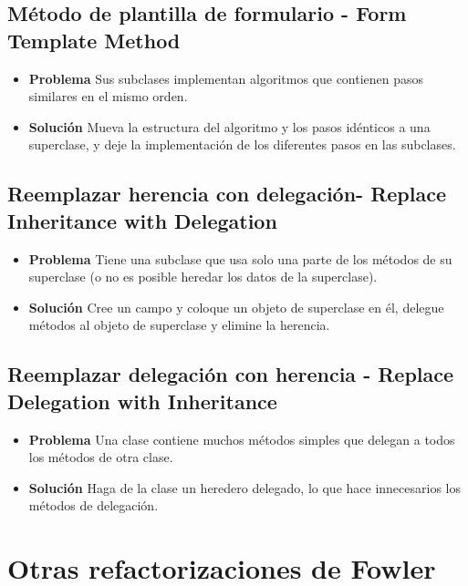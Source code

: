 \documentclass[11pt,a4paper,oneside]{book}
\begin{document}
\subsection{Método de plantilla de formulario - Form Template Method}
\label{formtemplatemethod}
\begin{itemize}
    \item \textbf{Problema} Sus subclases implementan algoritmos que contienen pasos similares en el mismo orden.
    \item \textbf{Solución}  Mueva la estructura del algoritmo y los pasos idénticos a una superclase, y deje la implementación de los diferentes pasos en las subclases.
\end{itemize}

\subsection{Reemplazar herencia con delegación- Replace Inheritance with Delegation}
\label{replaceinheritancewithdelegation}
\begin{itemize}
    \item \textbf{Problema} Tiene una subclase que usa solo una parte de los métodos de su superclase (o no es posible heredar los datos de la superclase).
    \item \textbf{Solución} Cree un campo y coloque un objeto de superclase en él, delegue métodos al objeto de superclase y elimine la herencia.
\end{itemize}

\subsection{Reemplazar delegación con herencia - Replace Delegation with Inheritance}
\label{replacedelegationwithinheritance}
\begin{itemize}
    \item \textbf{Problema} Una clase contiene muchos métodos simples que delegan a todos los métodos de otra clase.
    \item \textbf{Solución} Haga de la clase un heredero delegado, lo que hace innecesarios los métodos de delegación.
\end{itemize}


\section{Otras refactorizaciones de Fowler}
\end{document}
